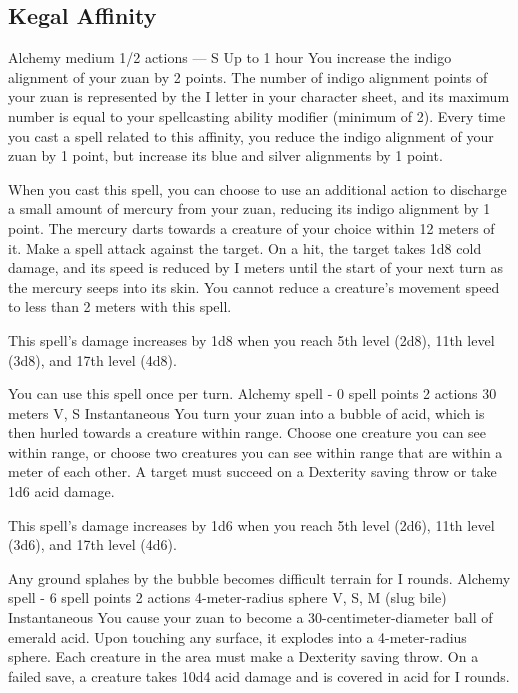 \subsection*{Kegal Affinity}
        {Alchemy medium}
        {1/2 actions}
        {---}
        {S}
        {Up to 1 hour}
        You increase the indigo alignment of your zuan by 2 points.
        The number of indigo alignment points of your zuan is represented by the I letter in your character sheet, and its maximum number is equal to your spellcasting ability modifier (minimum of 2).
        Every time you cast a spell related to this affinity, you reduce the indigo alignment of your zuan by 1 point, but increase its blue and silver alignments by 1 point.

        When you cast this spell, you can choose to use an additional action to discharge a small amount of mercury from your zuan, reducing its indigo alignment by 1 point.
        The mercury darts towards a creature of your choice within 12 meters of it.
        Make a spell attack against the target.
        On a hit, the target takes 1d8 cold damage, and its speed is reduced by I meters until the start of your next turn as the mercury seeps into its skin.
        You cannot reduce a creature's movement speed to less than 2 meters with this spell.

        This spell's damage increases by 1d8 when you reach 5th level (2d8), 11th level (3d8), and 17th level (4d8).

        You can use this spell once per turn.
        {Alchemy spell - 0 spell points}
        {2 actions}
        {30 meters}
        {V, S}
        {Instantaneous}
        You turn your zuan into a bubble of acid, which is then hurled towards a creature within range.
        Choose one creature you can see within range, or choose two creatures you can see within range that are within a meter of each other.
        A target must succeed on a Dexterity saving throw or take 1d6 acid damage.

        This spell's damage increases by 1d6 when you reach 5th level (2d6), 11th level (3d6), and 17th level (4d6).

        Any ground splahes by the bubble becomes difficult terrain for I rounds.
        {Alchemy spell - 6 spell points}
        {2 actions}
        {4-meter-radius sphere}
        {V, S, M (slug bile)}
        {Instantaneous}
        You cause your zuan to become a 30-centimeter-diameter ball of emerald acid.
        Upon touching any surface, it explodes into a 4-meter-radius sphere.
        Each creature in the area must make a Dexterity saving throw.
        On a failed save, a creature takes 10d4 acid damage and is covered in acid for I rounds.

